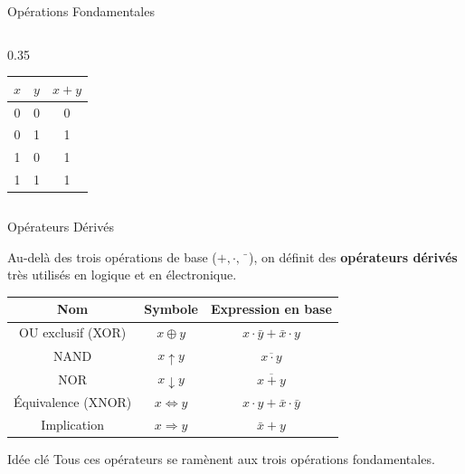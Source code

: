 \begin{frame}{Opérations Fondamentales}
\begin{columns}[T]
\begin{column}{0.35\textwidth}
            \begin{tabular}{|c|c|c|}
                \hline
                \(x\) & \(y\) & \(x + y\) \\
                \hline
                0 & 0 & 0 \\
                0 & 1 & 1 \\
                1 & 0 & 1 \\
                1 & 1 & 1 \\
                \hline
            \end{tabular}
        \end{column}
    \end{columns}

\end{frame}

\begin{frame}{Opérateurs Dérivés}

    Au-delà des trois opérations de base (\(+, \cdot, \bar{\phantom{x}}\)), on définit des \textbf{opérateurs dérivés} très utilisés en logique et en électronique.

    \vspace{0.4cm}

    \centering
    \begin{tabular}{|c|c|c|}
        \hline
        \textbf{Nom} & \textbf{Symbole} & \textbf{Expression en base} \\
        \hline
        OU exclusif (XOR) & \(x \oplus y\) & \(x \cdot \bar{y} + \bar{x} \cdot y\) \\
        NAND & \(x \uparrow y\) & \(\overline{x \cdot y}\) \\
        NOR & \(x \downarrow y\) & \(\overline{x + y}\) \\
        Équivalence (XNOR) & \(x \Leftrightarrow y\) & \(x \cdot y + \bar{x} \cdot \bar{y}\) \\
        Implication & \(x \Rightarrow y\) & \(\bar{x} + y\) \\
        \hline
    \end{tabular}

    \vspace{0.5cm}

    \begin{block}{Idée clé}
        Tous ces opérateurs se ramènent aux trois opérations fondamentales.
    \end{block}

\end{frame}

